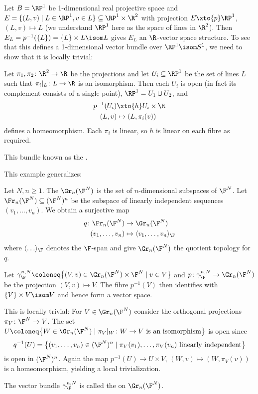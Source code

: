 \begin{example}
	Let $B = \RP^1$ be 1-dimensional real projective space and $E = \{(L, v) \mid L \in \RP^1, v \in L\} \subseteq \RP^1 \times \R^2$ with projection $E \xto{p} \RP^1$, $(L, v) \mapsto L$ (we understand $\RP^1$ here as the space of lines in $\R^2$).
	Then $E_L = p^{-1}(\{L\}) = \{L\} \times L \isom L$ gives $E_L$ an $\R$-vector space structure.
	To see that this defines a 1-dimensional vector bundle over $\RP^1 \isom S^1$, we need to show that it is locally trivial:

	Let $\pi_1, \pi_2\colon \R^2 \to \R$ be the projections and let $U_i \subseteq \RP^1$ be the set of lines $L$ such that $\pi_i|_L\colon L \to \R$ is an isomorphism.
	Then each $U_i$ is open (in fact its complement consists of a single point), $\RP^1 = U_1 \cup U_2$, and
	\begin{align*}
		p^{-1}(U_i) &\xto{h} U_i \times \R \\
		(L, v) &\mapsto (L, \pi_i(v))
	\end{align*}
	defines a homeomorphism.
	Each $\pi_i$ is linear, so $h$ is linear on each fibre as required.

	This bundle known as the .
\end{example}
This example generalizes:
\begin{example}\label{ex:defgrassmannian}
	Let $N, n \geq 1$.
	The  $\Gr_n(\F^N)$ is the set of $n$-dimensional subspaces of $\F^N$.
	Let $\Fr_n(\F^N) \subseteq (\F^N)^n$ be the subspace of linearly independent sequences $(v_1, \ldots, v_n)$.
	We obtain a surjective map 
	\begin{align*}
		q\colon \Fr_n(\F^N) &\to \Gr_n(\F^N) \\
		(v_1, \ldots, v_n) &\mapsto \langle v_1, \ldots, v_n\rangle_{\F}
	\end{align*}
	where $\langle \ldots\rangle_{\F}$ denotes the $\F$-span and give $\Gr_n(\F^N)$ the quotient topology for $q$.

	Let $\gamma_{\F}^{n, N} \coloneq \big\{(V, v) \in \Gr_n(\F^N) \times \F^N \mid v \in V\big\}$ and $p\colon \gamma_{\F}^{n, N} \to \Gr_n(\F^N)$ be the projection $(V, v) \mapsto V$.
	The fibre $p^{-1}(V)$ then identifies with $\{V\} \times V \isom V$ and hence form a vector space.

	This is locally trivial:
	For $V \in \Gr_n(\F^N)$ consider the orthogonal projections $\pi_V\colon \F^N \to V$.
	The set $U \coloneq \big\{W \in \Gr_n(\F^N) \mid \pi_V|_W\colon W \to V \text{ is an isomorphism}\big\}$ is open since 
	\begin{equation*}
		q^{-1}(U) = \big\{(v_1, \ldots, v_n) \in (\F^N)^n \mid \pi_V(v_1), \ldots, \pi_V(v_n) \text{ linearly independent}\big\}
	\end{equation*}
	is open in $(\F^N)^n$.
	Again the map $p^{-1}(U) \to U \times V$, $(W, v) \mapsto (W, \pi_V(v))$ is a homeomorphism, yielding a local trivialization.

	The vector bundle $\gamma_{\F}^{n, N}$ is called the  on $\Gr_n(\F^N)$.
\end{example}

